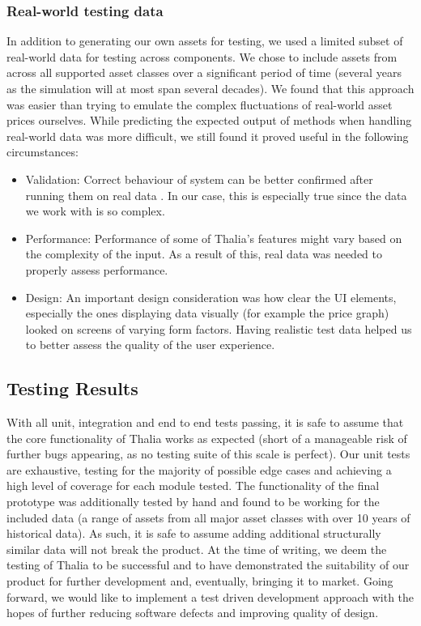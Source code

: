 \documentclass[main.tex]{subfiles}
\begin{document}
\subsubsection{Real-world testing data}

In addition to generating our own assets for testing, we used a limited subset of real-world data for testing across components. We chose to include assets from across all supported asset classes over a significant period of time (several years as the simulation will at most span several decades). We found that this approach was easier than trying to emulate the complex fluctuations of real-world asset prices ourselves. While predicting the expected output of methods when handling real-world data was more difficult, we still found it proved useful in the following circumstances: 

\begin{itemize}

\item Validation:
Correct behaviour of system can be better confirmed after running them on real data \cite{liveData}. In our case, this is especially true since the data we work with is so complex.

\item Performance:
Performance of some of Thalia's features might vary based on the complexity of the input. As a result of this, real data was needed to properly assess performance.

\item Design:
An important design consideration was how clear the UI elements, especially the ones displaying data visually (for example the price graph) looked on screens of varying form factors. Having realistic test data helped us to better assess the quality of the user experience.

\end{itemize}
 

\subsection{Testing Results}

With all unit, integration and end to end tests passing, it is safe to assume that the core functionality of Thalia works as expected (short of a manageable risk of further bugs appearing, as no testing suite of this scale is perfect). Our unit tests are exhaustive, testing for the majority of possible edge cases and achieving a high level of coverage for each module tested. The functionality of the final prototype was additionally tested by hand and found to be working for the included data (a range of assets from all major asset classes with over 10 years of historical data). As such, it is safe to assume adding additional structurally similar data will not break the product.
At the time of writing, we deem the testing of Thalia to be successful and to have demonstrated the suitability of our product for further development and, eventually, bringing it to market. Going forward, we would like to implement a test driven development approach with the hopes of further reducing software defects and  improving quality of design\cite{TDD}.
\end{document}

